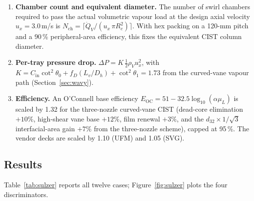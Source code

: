 \documentclass[11pt,letterpaper]{article}
\newcommand{\rhoV}{\rho_V}
\newcommand{\ux}{u_{x}}
\newcommand{\Rc}{R_c}
\begin{document}
\begin{enumerate}[nosep]
  \item \textbf{Chamber count and equivalent diameter.}  The number of
    swirl chambers required to pass the actual volumetric vapour load at
    the design axial velocity $\ux = 3.0$\,m/s is
    $N_{\mathrm{ch}} = \lceil \dot Q_V / (\ux\,\pi \Rc^2)\rceil$.  With
    hex packing on a 120-mm pitch and a 90\,\% peripheral-area
    efficiency, this fixes the equivalent CIST column diameter.
  \item \textbf{Per-tray pressure drop.}
    $\Delta P = K\,\tfrac12 \rhoV \ux^2$, with
    $K = C_{\mathrm{in}}\cot^2\theta_0 + f_D (L_v/D_h) + \cot^2\theta_1
    = 1.73$ from the curved-vane vapour path (Section~\ref{sec:wavy}).
  \item \textbf{Efficiency.}  An O'Connell base efficiency
    $E_{\mathrm{OC}} = 51 - 32.5\log_{10}(\alpha\mu_L)$ is scaled by
    1.32 for the three-nozzle curved-vane CIST (dead-core elimination
    $+10\%$, high-shear vane base $+12\%$, film renewal $+3\%$, and the
    $d_{32}\!\times\!1/\sqrt{3}$ interfacial-area gain $+7\%$ from the
    three-nozzle scheme), capped at 95\,\%.  The vendor decks are scaled
    by 1.10 (UFM) and 1.05 (SVG).
\end{enumerate}

\subsection{Results}

Table~\ref{tab:sulzer} reports all twelve cases; Figure~\ref{fig:sulzer}
plots the four discriminators.
\end{document}
